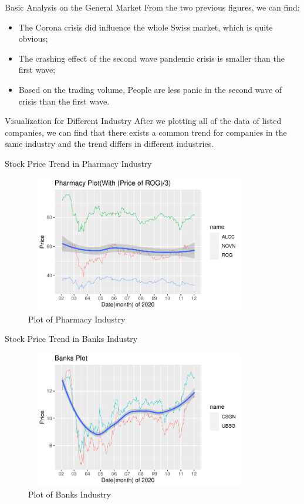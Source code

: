 \documentclass{beamer}
\begin{document}
\begin{frame}{Basic Analysis on the General Market}
From the two previous figures, we can find:
 \begin{itemize}
     \item The Corona crisis did influence the whole Swiss market, which is quite obvious;
     \item The crashing effect of the second wave pandemic crisis is smaller than the first wave;
     \item Based on the trading volume, People are less panic in the second wave of crisis than the first wave.
 \end{itemize}
\end{frame}

\begin{frame}{Visualization for Different Industry}
After we plotting all of the data of listed companies, we can find that there exists a common trend for companies in the same industry and the trend differs in different industries.
\end{frame}

\begin{frame}{Stock Price Trend in Pharmacy Industry}
    \begin{figure}
        \centering
        \includegraphics[width = 10cm, height = 6cm]{Pharmacy.pdf}
        \caption{Plot of Pharmacy Industry}
        \label{fig:mylabel3}
    \end{figure}
 \end{frame}   
\begin{frame}{Stock Price Trend in Banks Industry}
    \begin{figure}
        \centering
        \includegraphics[width = 10cm, height = 6cm]{Banks.pdf}
        \caption{Plot of Banks Industry}
        \label{fig:mylabel4}
    \end{figure}
\end{frame}    
    
\end{document}
